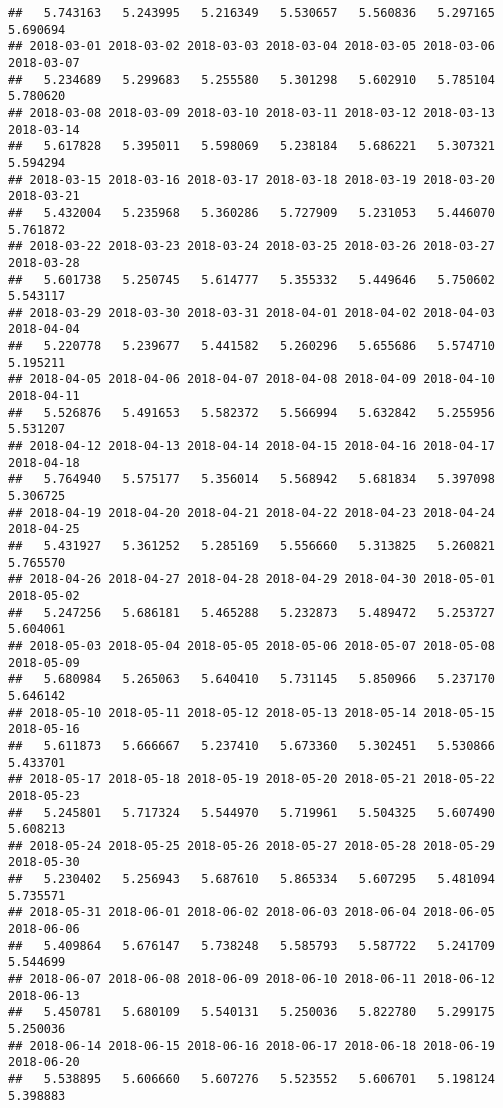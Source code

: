 \documentclass[
]{article}
\begin{document}
\begin{verbatim}
##   5.743163   5.243995   5.216349   5.530657   5.560836   5.297165   5.690694 
## 2018-03-01 2018-03-02 2018-03-03 2018-03-04 2018-03-05 2018-03-06 2018-03-07 
##   5.234689   5.299683   5.255580   5.301298   5.602910   5.785104   5.780620 
## 2018-03-08 2018-03-09 2018-03-10 2018-03-11 2018-03-12 2018-03-13 2018-03-14 
##   5.617828   5.395011   5.598069   5.238184   5.686221   5.307321   5.594294 
## 2018-03-15 2018-03-16 2018-03-17 2018-03-18 2018-03-19 2018-03-20 2018-03-21 
##   5.432004   5.235968   5.360286   5.727909   5.231053   5.446070   5.761872 
## 2018-03-22 2018-03-23 2018-03-24 2018-03-25 2018-03-26 2018-03-27 2018-03-28 
##   5.601738   5.250745   5.614777   5.355332   5.449646   5.750602   5.543117 
## 2018-03-29 2018-03-30 2018-03-31 2018-04-01 2018-04-02 2018-04-03 2018-04-04 
##   5.220778   5.239677   5.441582   5.260296   5.655686   5.574710   5.195211 
## 2018-04-05 2018-04-06 2018-04-07 2018-04-08 2018-04-09 2018-04-10 2018-04-11 
##   5.526876   5.491653   5.582372   5.566994   5.632842   5.255956   5.531207 
## 2018-04-12 2018-04-13 2018-04-14 2018-04-15 2018-04-16 2018-04-17 2018-04-18 
##   5.764940   5.575177   5.356014   5.568942   5.681834   5.397098   5.306725 
## 2018-04-19 2018-04-20 2018-04-21 2018-04-22 2018-04-23 2018-04-24 2018-04-25 
##   5.431927   5.361252   5.285169   5.556660   5.313825   5.260821   5.765570 
## 2018-04-26 2018-04-27 2018-04-28 2018-04-29 2018-04-30 2018-05-01 2018-05-02 
##   5.247256   5.686181   5.465288   5.232873   5.489472   5.253727   5.604061 
## 2018-05-03 2018-05-04 2018-05-05 2018-05-06 2018-05-07 2018-05-08 2018-05-09 
##   5.680984   5.265063   5.640410   5.731145   5.850966   5.237170   5.646142 
## 2018-05-10 2018-05-11 2018-05-12 2018-05-13 2018-05-14 2018-05-15 2018-05-16 
##   5.611873   5.666667   5.237410   5.673360   5.302451   5.530866   5.433701 
## 2018-05-17 2018-05-18 2018-05-19 2018-05-20 2018-05-21 2018-05-22 2018-05-23 
##   5.245801   5.717324   5.544970   5.719961   5.504325   5.607490   5.608213 
## 2018-05-24 2018-05-25 2018-05-26 2018-05-27 2018-05-28 2018-05-29 2018-05-30 
##   5.230402   5.256943   5.687610   5.865334   5.607295   5.481094   5.735571 
## 2018-05-31 2018-06-01 2018-06-02 2018-06-03 2018-06-04 2018-06-05 2018-06-06 
##   5.409864   5.676147   5.738248   5.585793   5.587722   5.241709   5.544699 
## 2018-06-07 2018-06-08 2018-06-09 2018-06-10 2018-06-11 2018-06-12 2018-06-13 
##   5.450781   5.680109   5.540131   5.250036   5.822780   5.299175   5.250036 
## 2018-06-14 2018-06-15 2018-06-16 2018-06-17 2018-06-18 2018-06-19 2018-06-20 
##   5.538895   5.606660   5.607276   5.523552   5.606701   5.198124   5.398883 

\end{verbatim}
\end{document}

